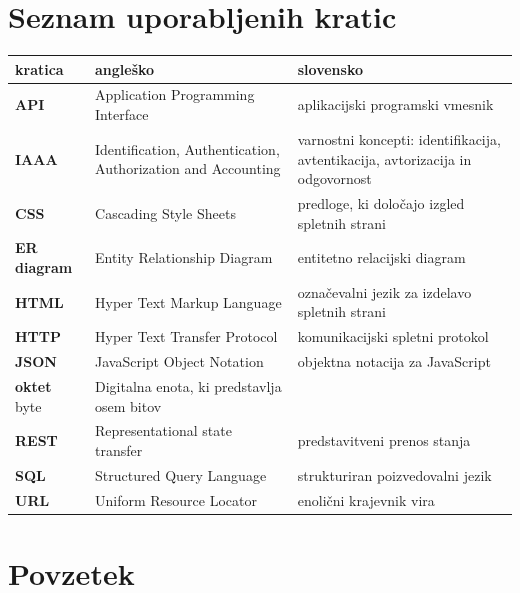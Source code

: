 \documentclass[a4paper, 12pt]{book}
\newcommand{\clearemptydoublepage}{\newpage{\pagestyle{empty}\cleardoublepage}}
\begin{document}
\chapter*{Seznam uporabljenih kratic}  %
\noindent\begin{tabular}{p{}|p{}|p{}}    %
  {\bf kratica} & {\bf angleško}                             & {\bf slovensko} \\ \hline
  {\bf API} & Application Programming Interface & aplikacijski programski vmesnik \\
  {\bf IAAA} & Identification, Authentication, Authorization and Accounting & varnostni koncepti: identifikacija, avtentikacija, avtorizacija in odgovornost \\
  {\bf CSS} & Cascading Style Sheets & predloge, ki določajo izgled spletnih strani \\
  {\bf ER diagram} & Entity Relationship Diagram & entitetno relacijski diagram \\
  {\bf HTML} & Hyper Text Markup Language & označevalni jezik za izdelavo spletnih strani \\
  {\bf HTTP} & Hyper Text Transfer Protocol & komunikacijski spletni protokol \\
  {\bf JSON} & JavaScript Object Notation & objektna notacija za JavaScript \\
  {\bf oktet} byte & Digitalna enota, ki predstavlja osem bitov \\
  {\bf REST} & Representational state transfer & predstavitveni prenos stanja \\
  {\bf SQL} & Structured Query Language & strukturiran poizvedovalni jezik \\
  {\bf URL} & Uniform Resource Locator & enolični krajevnik vira \\
\end{tabular}


\clearemptydoublepage

\chapter*{Povzetek}
\end{document}
